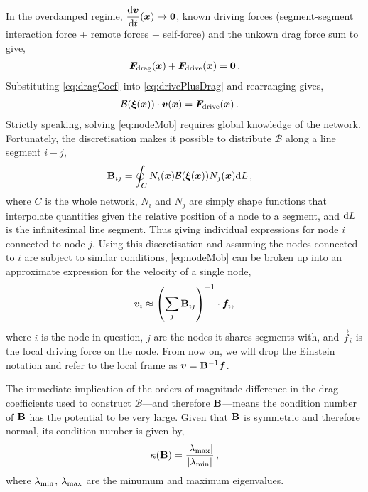 In the overdamped regime, $\dfrac{\rvar{d}\vec{v}}{\rvar{d}t}(\vec{x}) \to \vec{0}$, known driving forces (segment-segment interaction force + remote forces + self-force) and the unkown drag force sum to give,
\begin{align}\label{eq:drivePlusDrag}
    \vec{F}_\rvar{drag}(\vec{x}) + \vec{F}_\rvar{drive}(\vec{x}) = \vec{0}\,.
\end{align}
Substituting \cref{eq:dragCoef} into \cref{eq:drivePlusDrag} and rearranging gives,
\begin{align}\label{eq:nodeMob}
    \mathcal{B}(\vec{\xi}(\vec{x})) \cdot \vec{v}(\vec{x}) & = \vec{F}_\rvar{drive}(\vec{x})\,.
\end{align}
Strictly speaking, solving \cref{eq:nodeMob} requires global knowledge of the network. Fortunately, the discretisation makes it possible to distribute $\mathcal{B}$ along a line segment $i-j$,
\begin{align}\label{eq:dragMatrix}
    \mtx{B}_{ij} & = \oint_{C} N_i(\vec{x}) \mathcal{B}(\vec{\xi}(\vec{x})) N_j(\vec{x}) \rvar{d}L\,,
\end{align}
where $C$ is the whole network, $N_i$ and $N_j$ are simply shape functions that interpolate quantities given the relative position of a node to a segment, and $\textrm{d}L$ is the infinitesimal line segment. Thus giving individual expressions for node $i$ connected to node $j$. Using this discretisation and assuming the nodes connected to $i$ are subject to similar conditions, \cref{eq:nodeMob} can be broken up into an approximate expression for the velocity of a single node,
\begin{align}\label{eq:nodeVel}
    \vec{v}_i \approx \left(\sum\limits_j \mtx{B}_{ij}\right)^{-1} \cdot \vec{f}_i,\,
\end{align}
where $i$ is the node in question, $j$ are the nodes it shares segments with, and $\vec{f}_i$ is the local driving force on the node. From now on, we will drop the Einstein notation and refer to the local frame as $\vec{v} = \mtx{B}^{-1} \vec{f}$.

The immediate implication of the orders of magnitude difference in the drag coefficients used to construct $\mathcal{B}$---and therefore $\mathbf{B}$---means the condition number of $\mathbf{B}$ has the potential to be very large. Given that $\mathbf{B}$ is symmetric and therefore normal, its condition number is given by,
\begin{align}\label{eq:conditionNumb}
    \kappa(\mathbf{B}) = \dfrac{\lvert \lambda_{\textrm{max}} \rvert}{\lvert \lambda_{\textrm{min}} \rvert} \,,
\end{align}
where $\lambda_{\textrm{min}}$, $\lambda_{\textrm{max}}$ are the minumum and maximum eigenvalues.

